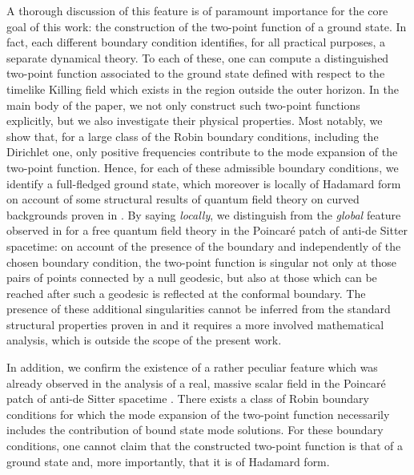 \documentclass[aps, prd, amsmath, floats, floatfix, twocolumn, nofootinbib, superscriptaddress, showpacs]{revtex4-1}
\begin{document}
A thorough discussion of this feature is of paramount importance for the
core goal of this work: the construction of the two-point function of a
ground state. In fact, each different boundary condition identifies, for
all practical purposes, a separate dynamical theory. To each of these,
one can compute a distinguished two-point function associated to the ground state defined 
with respect to the timelike Killing field which exists in the region outside the outer horizon. In
the main body of the paper, we not only construct such two-point
functions explicitly, but we also investigate their physical properties.
Most notably, we show that, for a large class of the Robin boundary
conditions, including the Dirichlet one, only positive frequencies
contribute to the mode expansion of the two-point function. Hence, for
each of these admissible boundary conditions, we identify a full-fledged
ground state, which moreover is locally of Hadamard form on account of
some structural results of quantum field theory on curved backgrounds
proven in \cite{Sahlmann:2000fh}. By saying \emph{locally}, we distinguish
from the \emph{global} feature observed in \cite{Dappiaggi:2016fwc,Dappiaggi:2017wvj} 
for a free quantum field theory in the Poincar\'e patch
of anti-de Sitter spacetime: on account of the presence
of the boundary and independently of the chosen boundary condition, the
two-point function is singular not only at those pairs of points
connected by a null geodesic, but also at those which can be reached
after such a geodesic is reflected at the conformal boundary. The
presence of these additional singularities cannot be inferred from the
standard structural properties proven in \cite{Sahlmann:2000fh} and it
requires a more involved mathematical analysis, which is outside the
scope of the present work.  

In addition, we confirm the existence of a rather peculiar feature which
was already observed in the analysis of a real, massive scalar field in
the Poincar\'e patch of anti-de Sitter spacetime \cite{Dappiaggi:2016fwc}. There exists a class
of Robin boundary conditions for which the mode expansion of the
two-point function necessarily includes the contribution of bound state
mode solutions. For these boundary conditions, one cannot
claim that the constructed two-point function is that of a ground
state and, more importantly, that it is of Hadamard form.
\end{document}
